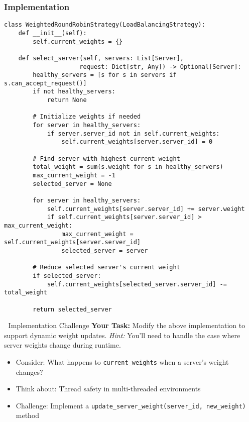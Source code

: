 \documentclass[12pt,a4paper]{article}
\begin{document}
\subsubsection{Implementation}
\begin{lstlisting}[caption=Weighted Round Robin Strategy,label=lst:weighted_implementation]
class WeightedRoundRobinStrategy(LoadBalancingStrategy):
    def __init__(self):
        self.current_weights = {}
    
    def select_server(self, servers: List[Server], 
                     request: Dict[str, Any]) -> Optional[Server]:
        healthy_servers = [s for s in servers if s.can_accept_request()]
        if not healthy_servers:
            return None
        
        # Initialize weights if needed
        for server in healthy_servers:
            if server.server_id not in self.current_weights:
                self.current_weights[server.server_id] = 0
        
        # Find server with highest current weight
        total_weight = sum(s.weight for s in healthy_servers)
        max_current_weight = -1
        selected_server = None
        
        for server in healthy_servers:
            self.current_weights[server.server_id] += server.weight
            if self.current_weights[server.server_id] > max_current_weight:
                max_current_weight = self.current_weights[server.server_id]
                selected_server = server
        
        # Reduce selected server's current weight
        if selected_server:
            self.current_weights[selected_server.server_id] -= total_weight
        
        return selected_server
\end{lstlisting}

\begin{exercisebox}{🔧 Implementation Challenge}
\textbf{Your Task:} Modify the above implementation to support dynamic weight updates. 
\textit{Hint:} You'll need to handle the case where server weights change during runtime.
\begin{itemize}
    \item Consider: What happens to \texttt{current\_weights} when a server's weight changes?
    \item Think about: Thread safety in multi-threaded environments
    \item Challenge: Implement a \texttt{update\_server\_weight(server\_id, new\_weight)} method
\end{itemize}
\end{exercisebox}
\end{document}
